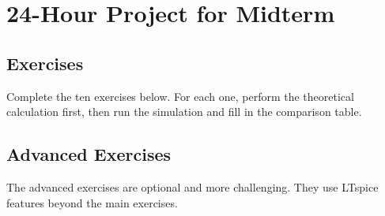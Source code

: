 \chapter{24-Hour Project for Midterm}




\clearpage
\section{Exercises}
Complete the ten exercises below. For each one, perform the theoretical calculation first,
then run the simulation and fill in the comparison table.












\clearpage
\section{Advanced Exercises}
The advanced exercises are optional and more challenging. They use LTspice features beyond the main exercises.





